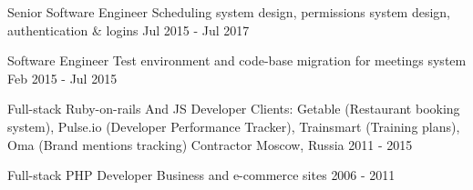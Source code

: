 \begin{cventries}
    \cvblitz
    {Senior Software Engineer} %
    {Scheduling system design, permissions system design, authentication \& logins} %
    {} %
    {} %
    {Jul 2015 - Jul 2017} %

    \cvblitz
    {Software Engineer} %
    {Test environment and code-base migration for meetings system} %
    {} %
    {} %
    {Feb 2015 - Jul 2015} %




    \cvblitz
    {Full-stack Ruby-on-rails And JS Developer} %
    {Clients: Getable (Restaurant booking system), Pulse.io (Developer Performance Tracker), Trainsmart (Training plans), Oma (Brand mentions tracking)} %
    {Contractor} %
    {Moscow, Russia} %
    {2011 - 2015} %

    \cvblitz
    {Full-stack PHP Developer} %
    {Business and e-commerce sites} %
    {} %
    {} %
    {2006 - 2011} %

\end{cventries}
